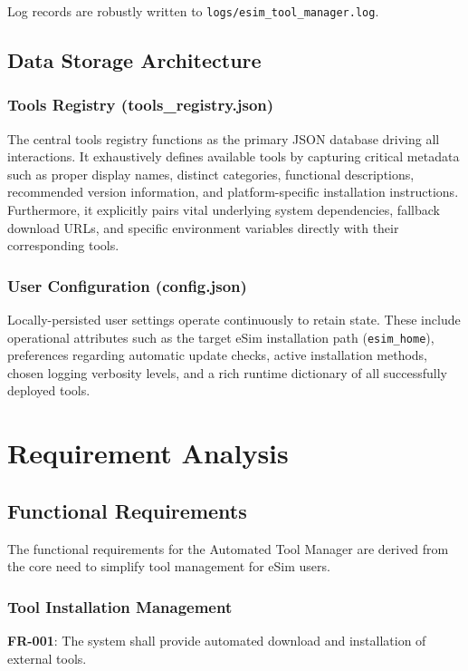 \documentclass[12pt,a4paper]{report}
\begin{document}
Log records are robustly written to \texttt{logs/esim\_tool\_manager.log}.

\section{Data Storage Architecture}
\subsection{Tools Registry (tools\_registry.json)}
The central tools registry functions as the primary JSON database driving all interactions. It exhaustively defines available tools by capturing critical metadata such as proper display names, distinct categories, functional descriptions, recommended version information, and platform-specific installation instructions. Furthermore, it explicitly pairs vital underlying system dependencies, fallback download URLs, and specific environment variables directly with their corresponding tools.

\subsection{User Configuration (config.json)}
Locally-persisted user settings operate continuously to retain state. These include operational attributes such as the target eSim installation path (\texttt{esim\_home}), preferences regarding automatic update checks, active installation methods, chosen logging verbosity levels, and a rich runtime dictionary of all successfully deployed tools.

\chapter{Requirement Analysis}
\section{Functional Requirements}
The functional requirements for the Automated Tool Manager are derived from the core need to simplify tool management for eSim users.

\subsection{Tool Installation Management}
\textbf{FR-001}: The system shall provide automated download and installation of external tools.
\end{document}
